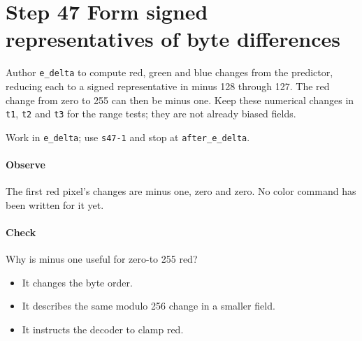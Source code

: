 \section{Step 47 Form signed representatives of byte differences}\label{qoi-s47}
Author \texttt{e\_delta} to compute red, green and blue changes from the predictor, reducing each to a signed representative in minus 128 through 127. The red change from zero to 255 can then be minus one. Keep these numerical changes in \texttt{t1}, \texttt{t2} and \texttt{t3} for the range tests; they are not already biased fields.

Work in \texttt{e\_delta}; use \texttt{s47-1} and stop at \texttt{after\_e\_delta}.

\paragraph{Observe} The first red pixel’s changes are minus one, zero and zero. No color command has been written for it yet.

\paragraph{Check} Why is minus one useful for zero-to 255 red?
\begin{itemize}
  \item[A.] It changes the byte order.
  \item[B.] It describes the same modulo 256 change in a smaller field.
  \item[C.] It instructs the decoder to clamp red.
\end{itemize}
